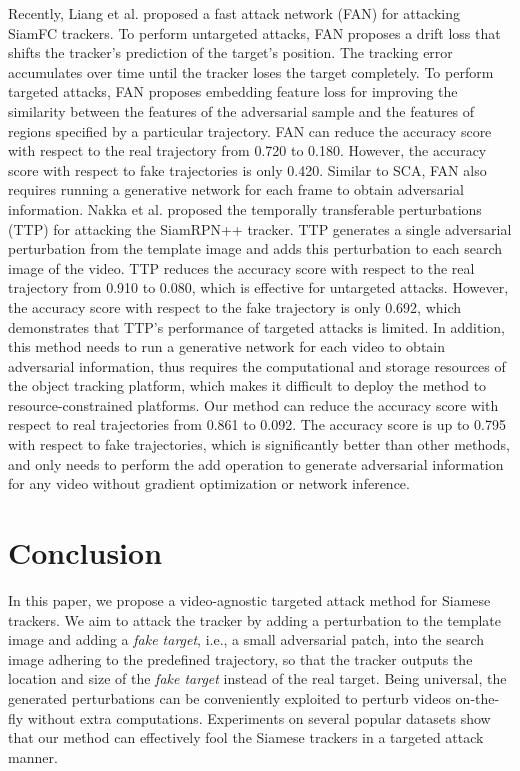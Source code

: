 \documentclass[journal]{IEEEtran}
\newcommand{\ie}{i.e.}
\begin{document}
Recently, Liang et al. proposed a fast attack network (FAN) \cite{FAN} for attacking SiamFC trackers. To perform untargeted attacks, FAN proposes a drift loss that shifts the tracker's prediction of the target's position. The tracking error accumulates over time until the tracker loses the target completely. To perform targeted attacks, FAN proposes embedding feature loss for improving the similarity between the features of the adversarial sample and the features of regions specified by a particular trajectory. FAN can reduce the accuracy score with respect to the real trajectory from 0.720 to 0.180. However, the accuracy score with respect to fake trajectories is only 0.420. Similar to SCA, FAN also requires running a generative network for each frame to obtain adversarial information. Nakka et al. \cite{TTP} proposed the temporally transferable perturbations (TTP) for attacking the SiamRPN++ tracker. TTP generates a single adversarial perturbation from the template image and adds this perturbation to each search image of the video. TTP reduces the accuracy score with respect to the real trajectory from 0.910 to 0.080, which is effective for untargeted attacks. However, the accuracy score with respect to the fake trajectory is only 0.692, which demonstrates that TTP's performance of targeted attacks is limited. In addition, this method needs to run a generative network for each video to obtain adversarial information, thus requires the computational and storage resources of the object tracking platform, which makes it difficult to deploy the method to resource-constrained platforms. Our method can reduce the accuracy score with respect to real trajectories from 0.861 to 0.092. The accuracy score is up to 0.795 with respect to fake trajectories, which is significantly better than other methods, and only needs to perform the add operation to generate adversarial information for any video without gradient optimization or network inference.

\section{Conclusion}

In this paper, we propose a video-agnostic targeted attack method for Siamese trackers. 
We aim to attack the tracker by adding a perturbation to the template image and adding a \textit{fake target}, \ie, a small adversarial patch, into the search image adhering to the predefined trajectory, so that the tracker outputs the location and size of the \textit{fake target} instead of the real target. Being universal, the generated perturbations can be conveniently exploited to perturb videos on-the-fly without extra computations.
Experiments on several popular datasets show that our method can effectively fool the Siamese trackers in a targeted attack manner.
\end{document}
